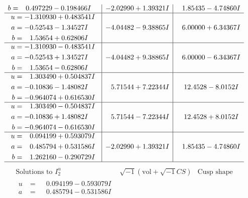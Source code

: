 \documentclass[1p]{elsarticle_modified}
\theoremstyle{definition}
\newcommand{\I}{\sqrt{-1}}
\begin{document}
$$\begin{array}{c|c|c}
\begin{aligned}
b &= \phantom{-}0.497229 - 0.198466 I\end{aligned}
 & -2.02990 + 1.39321 I & \phantom{-}1.85435 - 4.74860 I \\ \hline\begin{aligned}
u &= -1.310930 + 0.483541 I \\
a &= -0.52543 - 1.34527 I \\
b &= \phantom{-}1.53654 + 0.62806 I\end{aligned}
 & -4.04482 - 9.38865 I & \phantom{-}6.00000 + 6.34367 I \\ \hline\begin{aligned}
u &= -1.310930 - 0.483541 I \\
a &= -0.52543 + 1.34527 I \\
b &= \phantom{-}1.53654 - 0.62806 I\end{aligned}
 & -4.04482 + 9.38865 I & \phantom{-}6.00000 - 6.34367 I \\ \hline\begin{aligned}
u &= \phantom{-}1.303490 + 0.504837 I \\
a &= -0.10836 - 1.48082 I \\
b &= -0.964074 + 0.616530 I\end{aligned}
 & \phantom{-}5.71544 + 7.22344 I & \phantom{-}12.4528 - 8.0152 I \\ \hline\begin{aligned}
u &= \phantom{-}1.303490 - 0.504837 I \\
a &= -0.10836 + 1.48082 I \\
b &= -0.964074 - 0.616530 I\end{aligned}
 & \phantom{-}5.71544 - 7.22344 I & \phantom{-}12.4528 + 8.0152 I \\ \hline\begin{aligned}
u &= \phantom{-}0.094199 + 0.593079 I \\
a &= \phantom{-}0.485794 + 0.531586 I \\
b &= \phantom{-}1.262160 - 0.290729 I\end{aligned}
 & -2.02990 + 1.39321 I & \phantom{-}1.85435 - 4.74860 I\\
 \hline 
 \end{array}$$\newpage$$\begin{array}{c|c|c}  
\text{Solutions to }I^u_{2}& \I (\text{vol} + \sqrt{-1}CS) & \text{Cusp shape}\\
 \hline 
\begin{aligned}
u &= \phantom{-}0.094199 - 0.593079 I \\
a &= \phantom{-}0.485794 - 0.531586 I \\

\end{aligned}
\end{array}$$
\end{document}
